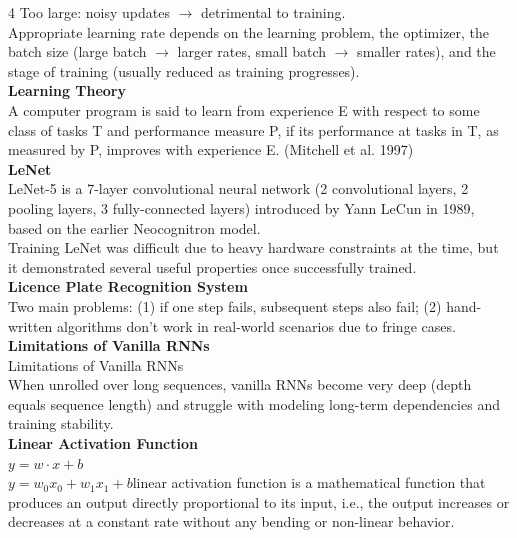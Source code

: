 \documentclass[8pt]{extarticle}
\begin{document}
\begin{multicols}{4}
{Too large: noisy updates $\rightarrow$ detrimental to training.\\
Appropriate learning rate depends on the learning problem, the optimizer, the batch size (large batch $\rightarrow$ larger rates, small batch $\rightarrow$ smaller rates), and the stage of training (usually reduced as training progresses).\\
\vspace{2pt}\textbf{Learning Theory}\\
A computer program is said to learn from experience E with respect to some class of tasks T and performance measure P, if its performance at tasks in T, as measured by P, improves with experience E. (Mitchell et al. 1997)\\
\vspace{2pt}\textbf{LeNet}\\
LeNet-5 is a 7-layer convolutional neural network (2 convolutional layers, 2 pooling layers, 3 fully-connected layers) introduced by Yann LeCun in 1989, based on the earlier Neocognitron model.\\
Training LeNet was difficult due to heavy hardware constraints at the time, but it demonstrated several useful properties once successfully trained.\\
\vspace{2pt}\textbf{Licence Plate Recognition System}\\
Two main problems: (1) if one step fails, subsequent steps also fail; (2) hand-written algorithms don't work in real-world scenarios due to fringe cases.\\
\vspace{2pt}\textbf{Limitations of Vanilla RNNs}\\
Limitations of Vanilla RNNs\\
When unrolled over long sequences, vanilla RNNs become very deep (depth equals sequence length) and struggle with modeling long-term dependencies and training stability.\\
\vspace{2pt}\textbf{Linear Activation Function}\\
$y = w \cdot x + b$\\
$y = w_0 x_0 + w_1 x_1 + b$\A linear activation function is a mathematical function that produces an output directly proportional to its input, i.e., the output increases or decreases at a constant rate without any bending or non-linear behavior.\\

}
\end{multicols}
\end{document}
